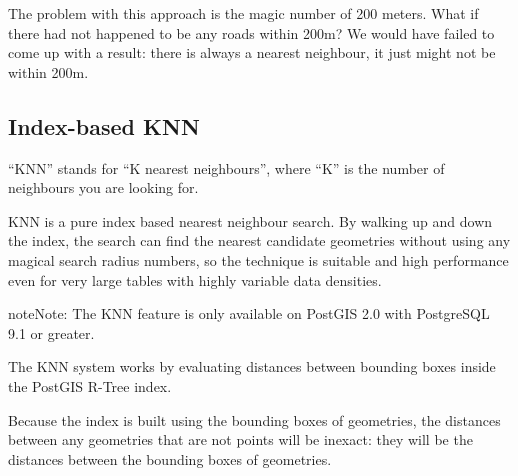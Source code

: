\documentclass[a4paper,11pt,english]{sphinxmanual}
\begin{document}
\begin{sphinxVerbatim}[commandchars=\\\{\}]
  
   
   
   
     
    
 
\end{sphinxVerbatim}

The problem with this approach is the magic number of 200 meters. What if there had not happened to be any roads within 200m? We would have failed to come up with a result: there is always a nearest neighbour, it just might not be within 200m.


\subsection{Index-based KNN}
\label{\detokenize{advanced:index-based-knn}}
“KNN” stands for “K nearest neighbours”, where “K” is the number of neighbours you are looking for.

KNN is a pure index based nearest neighbour search. By walking up and down the index, the search can find the nearest candidate geometries without using any magical search radius numbers, so the technique is suitable and high performance even for very large tables with highly variable data densities.

\begin{sphinxadmonition}{note}{Note:}
The KNN feature is only available on PostGIS 2.0 with PostgreSQL 9.1 or greater.
\end{sphinxadmonition}

The KNN system works by evaluating distances between bounding boxes inside the PostGIS R-Tree index.

Because the index is built using the bounding boxes of geometries, the distances between any geometries that are not points will be inexact: they will be the distances between the bounding boxes of geometries.
\end{document}
